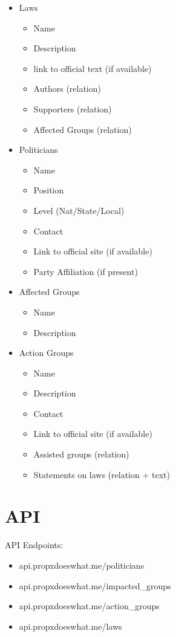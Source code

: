 \documentclass[12pt]{article}
\begin{document}
\begin{itemize}
	\item[] Laws
	\begin{itemize}
		\item Name
		\item Description
		\item link to official text (if available)
		\item Authors (relation)
		\item Supporters (relation)
		\item Affected Groups (relation)
	\end{itemize}
	\item[] Politicians
	\begin{itemize}
		\item Name
		\item Position
		\item Level (Nat/State/Local)
		\item Contact
		\item Link to official site (if available)
		\item Party Affiliation (if present)
	\end{itemize}
	\item[] Affected Groups
	\begin{itemize}
		\item Name
		\item Description
	\end{itemize}
	\item[] Action Groups
	\begin{itemize}
		\item Name
		\item Description
		\item Contact
		\item Link to official site (if available)
		\item Assisted groups (relation)
		\item Statements on laws (relation + text)
	\end{itemize}
\end{itemize}

\section{API}

API Endpoints: \\

\begin{itemize}
	\item api.propxdoeswhat.me/politicians
	\item api.propxdoeswhat.me/impacted\_groups
	\item api.propxdoeswhat.me/action\_groups
	\item api.propxdoeswhat.me/laws
\end{itemize}
\end{document}

